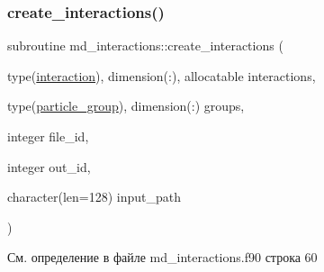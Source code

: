 \subsubsection{\texorpdfstring{create\+\_\+interactions()}{create\_interactions()}}
{\footnotesize\ttfamily subroutine md\+\_\+interactions\+::create\+\_\+interactions (\begin{DoxyParamCaption}\item[{type(\mbox{\hyperlink{structmd__interactions_1_1interaction}{interaction}}), dimension(\+:), allocatable}]{interactions,  }\item[{type(\mbox{\hyperlink{structmd__general_1_1particle__group}{particle\+\_\+group}}), dimension(\+:)}]{groups,  }\item[{integer}]{file\+\_\+id,  }\item[{integer}]{out\+\_\+id,  }\item[{character(len=128)}]{input\+\_\+path }\end{DoxyParamCaption})}



См. определение в файле md\+\_\+interactions.\+f90 строка 60


